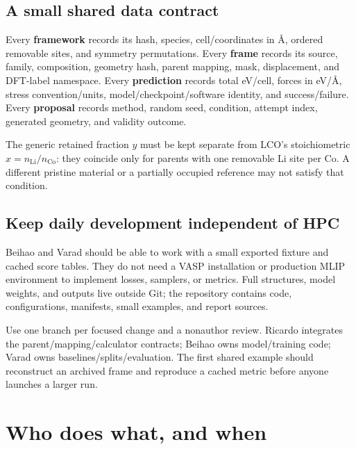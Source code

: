 \subsection*{A small shared data contract}
Every \textbf{framework} records its hash, species, cell/coordinates in \AA, ordered removable sites, and symmetry permutations. Every \textbf{frame} records its source, family, composition, geometry hash, parent mapping, mask, displacement, and DFT-label namespace. Every \textbf{prediction} records total eV/cell, forces in eV/\AA, stress convention/units, model/checkpoint/software identity, and success/failure. Every \textbf{proposal} records method, random seed, condition, attempt index, generated geometry, and validity outcome.

The generic retained fraction $y$ must be kept separate from LCO's stoichiometric $x=n_{\mathrm{Li}}/n_{\mathrm{Co}}$: they coincide only for parents with one removable Li site per Co. A different pristine material or a partially occupied reference may not satisfy that condition.

\subsection*{Keep daily development independent of HPC}
Beihao and Varad should be able to work with a small exported fixture and cached score tables. They do not need a VASP installation or production MLIP environment to implement losses, samplers, or metrics. Full structures, model weights, and outputs live outside Git; the repository contains code, configurations, manifests, small examples, and report sources.

Use one branch per focused change and a nonauthor review. Ricardo integrates the parent/mapping/calculator contracts; Beihao owns model/training code; Varad owns baselines/splits/evaluation. The first shared example should reconstruct an archived frame and reproduce a cached metric before anyone launches a larger run.

\clearpage
\section{Who does what, and when}

